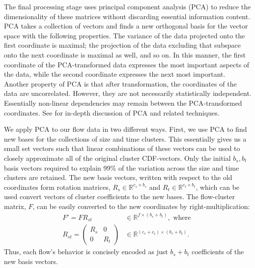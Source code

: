 \documentclass[conference]{IEEEtran}
\newcommand{\caps}[1]{{\small{#1}}}
\newcommand{\R}{\mathbb{R}}
\begin{document}

The final processing stage uses principal component analysis (\caps{PCA}) to reduce the dimensionality of these matrices without discarding essential information content. \caps{PCA} takes a collection of vectors and finds a new orthogonal basis for the vector space with the following properties. The variance of the data projected onto the first coordinate is maximal; the projection of the data excluding that subspace onto the next coordinate is maximal as well, and so on. In this manner, the first coordinate of the \caps{PCA}-transformed data expresses the most important aspects of the data, while the second coordinate expresses the next most important. Another property of \caps{PCA} is that after transformation, the coordinates of the data are uncorrelated. However, they are not necessarily statistically independent. Essentially non-linear dependencies may remain between the \caps{PCA}-transformed coordinates. See \cite{Liang01} for in-depth discussion of \caps{PCA} and related techniques.

We apply \caps{PCA} to our flow data in two different ways. First, we use \caps{PCA} to find new bases for the collections of size and time clusters. This essentially gives us a small set vectors such that linear combinations of these vectors can be used to closely approximate all of the original cluster CDF-vectors. Only the initial $b_s,b_t$ basis vectors required to explain 99\% of the variation across the size and time clusters are retained. The new basis vectors, written with respect to the old coordinates form rotation matrices, $R_s \in \R^{c_s \times b_s}$ and $R_t \in \R^{c_t \times b_t}$, which can be used convert vectors of cluster coefficients to the new bases. The flow-cluster matrix, $F$, can be easily converted to the new coordinates by right-multiplication:
\begin{align}
F' = F R_{st} &\in \R^{f \times (b_s+b_t)}, \text{ where } \\
R_{st} = \begin{pmatrix}
R_s & 0 \\
0 & R_t
\end{pmatrix} &\in \R^{(c_s+c_t)\times(b_s+b_t)}.
\end{align}
Thus, each flow's behavior is concisely encoded as just $b_s+b_t$ coefficients of the new basis vectors.
\end{document}

